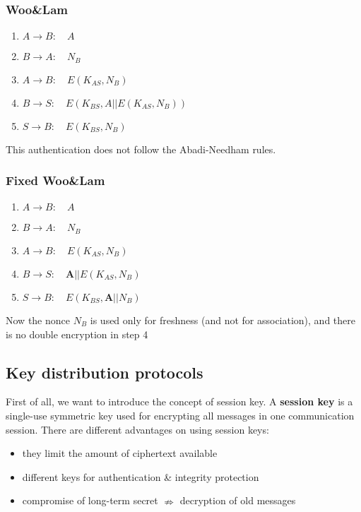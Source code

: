 \subsubsection{Woo\&Lam}
\begin{enumerate}
    \item $A\rightarrow B:\hspace{1em} A$
    \item $B\rightarrow A:\hspace{1em} N_B$
    \item $A\rightarrow B:\hspace{1em} E(K_{AS},N_B)$
    \item $B\rightarrow S:\hspace{1em} E(K_{BS}, A||E(K_{AS},N_B))$
    \item $S\rightarrow B:\hspace{1em} E(K_{BS},N_B)$
\end{enumerate}
This authentication does not follow the Abadi-Needham rules.
\subsubsection{Fixed Woo\&Lam}
\begin{enumerate}
    \item $A\rightarrow B:\hspace{1em} A$
    \item $B\rightarrow A:\hspace{1em} N_B$
    \item $A\rightarrow B:\hspace{1em} E(K_{AS},N_B)$
    \item $B\rightarrow S:\hspace{1em} \textbf{A}||E(K_{AS},N_B)$
    \item $S\rightarrow B:\hspace{1em} E(K_{BS},\boldsymbol{A}||N_B)$
\end{enumerate}
Now the nonce $N_B$ is used only for freshness (and not for association), and there is no double encryption in step 4


\subsection{Key distribution protocols}
First of all, we want to introduce the concept of session key. A \textbf{session key} is a single-use symmetric key used for encrypting all messages in one communication session. There are different advantages on using session keys:
\begin{itemize}
    \item they limit the amount of ciphertext available
    \item different keys for authentication \& integrity protection
    \item compromise of long-term secret $\nRightarrow$ decryption of old messages
\end{itemize}
